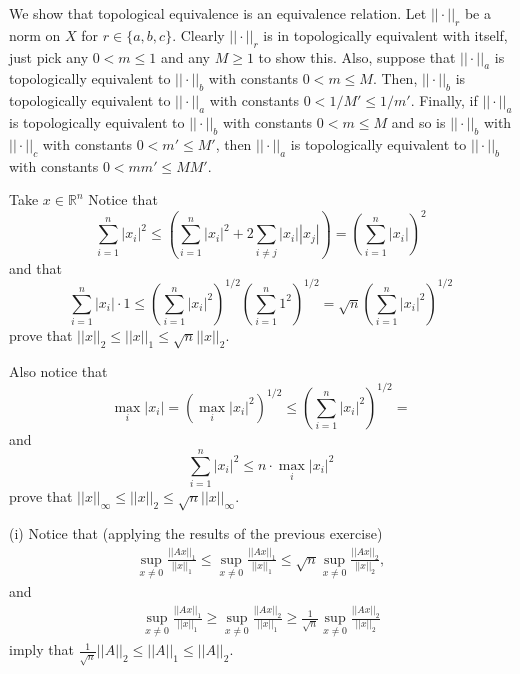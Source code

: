 \documentclass[letterpaper,12pt]{article}
\theoremstyle{definition}
\newenvironment{problem}[2][Problem]{\begin{trivlist}
\item[\hskip \labelsep {\bfseries #1}\hskip \labelsep {\bfseries #2.}]}{\end{trivlist}}
\begin{document}
\begin{problem}{24}
\end{problem} \begin{problem}{26}
We show that topological equivalence is an equivalence relation.
Let $||\cdot||_r$ be a norm on $X$ for $r\in\{a, b, c\}$.
Clearly $||\cdot||_r$ is in topologically equivalent with itself,
just pick any $0<m\leq 1$ and any $M\geq 1$ to show this.
Also, suppose that $||\cdot||_a$ is topologically equivalent to $||\cdot||_b$
with constants $0<m\leq M$.
Then, $||\cdot||_b$ is topologically equivalent to $||\cdot||_a$ with constants
$0<1/M'\leq 1/m'$.
Finally, if $||\cdot||_a$ is topologically equivalent to $||\cdot||_b$ with constants
$0<m\leq M$ and so is $||\cdot||_b$ with $||\cdot||_c$ with constants $0<m'\leq M'$,
then $||\cdot||_a$ is topologically equivalent to $||\cdot||_b$ with constants
$0<mm'\leq MM'$.

Take $x\in\mathbb R^n$
Notice that
\begin{equation*}
    \sum_{i=1}^n|x_i|^2\leq
    \left(\sum_{i=1}^n|x_i|^2+2\sum_{i\neq j}|x_i||x_j|\right)=
    \left(\sum_{i=1}^n|x_i|\right)^2
\end{equation*}
and that
\begin{equation*}
    \sum_{i=1}^n|x_i|\cdot1\leq
    \left(\sum_{i=1}^n|x_i|^2\right)^{1/2}\left(\sum_{i=1}^n1^2\right)^{1/2}=
    \sqrt{n}\left(\sum_{i=1}^n|x_i|^2\right)^{1/2}
\end{equation*}
prove that $||x||_2\leq||x||_1\leq\sqrt{n}||x||_2$.

Also notice that
\begin{equation*}
    \max_{i}|x_i|=\left(\max_i|x_i|^2\right)^{1/2}\leq
    \left(\sum_{i=1}^n|x_i|^2\right)^{1/2}=
\end{equation*}
and
\begin{equation*}
    \sum_{i=1}^n|x_i|^2\leq n\cdot\max_i|x_i|^2
\end{equation*}
prove that $||x||_\infty\leq||x||_2\leq \sqrt{n}||x||_\infty$.

\end{problem} \begin{problem}{28}
(i)
Notice that (applying the results of the previous exercise)
\begin{align*}
    \sup_{x\neq 0}\frac{||Ax||_1}{||x||_1}\leq
    \sup_{x\neq 0}\frac{||Ax||_1}{||x||_1}\leq
    \sqrt{n}\sup_{x\neq 0}\frac{||Ax||_2}{||x||_2},
\end{align*}
and
\begin{align*}
    \sup_{x\neq 0}\frac{||Ax||_1}{||x||_1}\geq
    \sup_{x\neq 0}\frac{||Ax||_2}{||x||_1}\geq
    \frac{1}{\sqrt{n}}\sup_{x\neq 0}\frac{||Ax||_2}{||x||_2}
\end{align*}
imply that $\frac{1}{\sqrt{n}}||A||_2\leq||A||_1\leq||A||_2$.


\end{problem}
\end{document}
